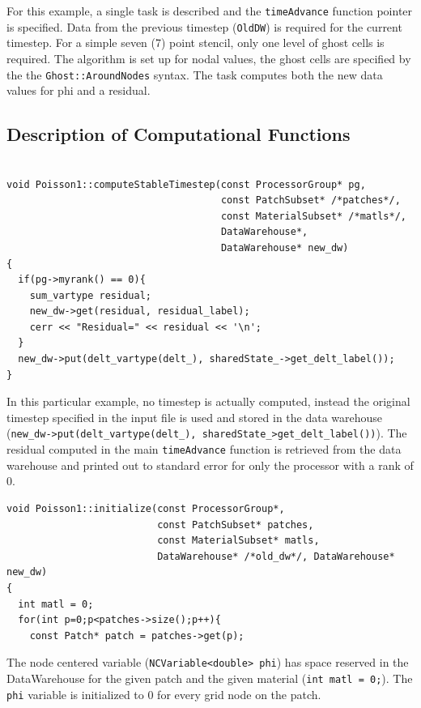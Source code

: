 \documentclass[12pt]{report}
\begin{document}
For this example, a single task is described and the
\texttt{timeAdvance} function pointer is specified.  Data from the
previous timestep (\texttt{OldDW}) is required for the current
timestep.  For a simple seven (7) point stencil, only one level of
ghost cells is required.  The algorithm is set up for nodal values,
the ghost cells are specified by the the \texttt{Ghost::AroundNodes}
syntax.  The task computes both the new data values for phi and a
residual.

\subsection{Description of Computational Functions}

\begin{Verbatim}[fontsize=\footnotesize]

void Poisson1::computeStableTimestep(const ProcessorGroup* pg,
                                     const PatchSubset* /*patches*/,
                                     const MaterialSubset* /*matls*/,
                                     DataWarehouse*,
                                     DataWarehouse* new_dw)
{
  if(pg->myrank() == 0){
    sum_vartype residual;
    new_dw->get(residual, residual_label);
    cerr << "Residual=" << residual << '\n';
  }
  new_dw->put(delt_vartype(delt_), sharedState_->get_delt_label());
}

\end{Verbatim}

In this particular example, no timestep is actually computed, instead
the original timestep specified in the input file is used and stored
in the data warehouse (\texttt{new\_dw->put(delt\_vartype(delt\_),
  sharedState\_\->get\_delt\_label())}).  The residual computed in the
main \texttt{timeAdvance} function is retrieved from the data
warehouse and printed out to standard error for only the processor
with a rank of 0.

\begin{Verbatim}[fontsize=\footnotesize]
void Poisson1::initialize(const ProcessorGroup*,
                          const PatchSubset* patches,
                          const MaterialSubset* matls,
                          DataWarehouse* /*old_dw*/, DataWarehouse* new_dw)
{
  int matl = 0;
  for(int p=0;p<patches->size();p++){
    const Patch* patch = patches->get(p);

\end{Verbatim}

The node centered variable (\texttt{NCVariable<double> phi}) has space
reserved in the DataWarehouse for the given patch and the given
material (\texttt{int matl = 0;}).  The \texttt{phi} variable is
initialized to 0 for every grid node on the patch.
\end{document}
